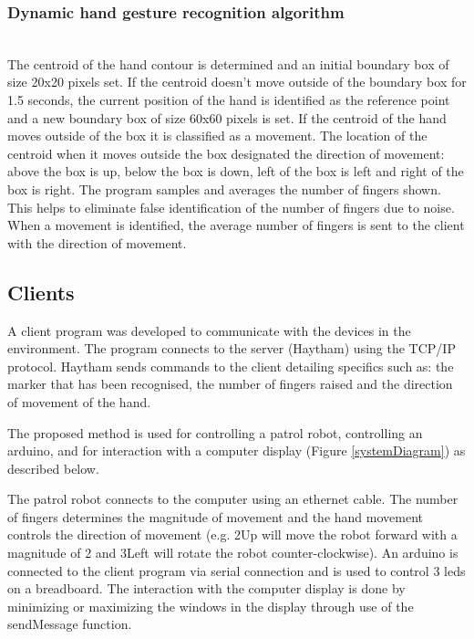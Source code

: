 \documentclass[jou,a4paper,notxfonts]{apa}
\begin{document}
\subsubsection{Dynamic hand gesture recognition algorithm}\hspace{0pt} \\
The centroid of the hand contour is determined and an initial boundary box of size 20x20 pixels set. If the centroid doesn't move outside of the boundary box for 1.5 seconds, the current position of the hand is identified as the reference point and a new boundary box of size 60x60 pixels is set. If the centroid of the hand moves outside of the box it is classified as a movement. The location of the centroid when it moves outside the box designated the direction of movement: above the box is up, below the box is down, left of the box is left and right of the box is right. The program samples and averages the number of fingers shown. This helps to eliminate false identification of the number of fingers due to noise. When a movement is identified, the average number of fingers is sent to the client with the direction of movement.

\subsection{Clients}
A client program was developed to communicate with the devices in the environment. The program connects to the server (Haytham) using the TCP/IP protocol. Haytham sends commands to the client detailing specifics such as: the marker that has been recognised, the number of fingers raised and the direction of movement of the hand. 

The proposed method is used for controlling a patrol robot, controlling an arduino, and for interaction with a computer display (Figure \ref{systemDiagram}) as described below.

The patrol robot connects to the computer using an ethernet cable. The number of fingers determines the magnitude of movement and the hand movement controls the direction of movement (e.g. 2Up will move the robot forward with a magnitude of 2 and 3Left will rotate the robot counter-clockwise). An arduino is connected to the client program via serial connection and is used to control 3 leds on a breadboard. The interaction with the computer display is done by minimizing or maximizing the windows in the display through use of the sendMessage function.
\end{document}
